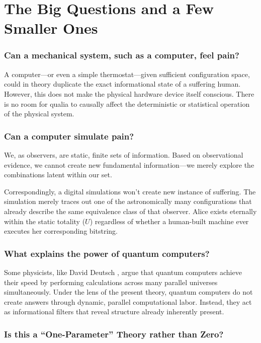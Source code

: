\chapter{The Big Questions and a Few Smaller Ones}
\label{chap:faq}

\subsection*{Can a mechanical system, such as a computer, feel pain?}

A computer—or even a simple thermostat—given sufficient configuration space, could in theory duplicate the exact informational state of a suffering human.
However, this does not make the physical hardware device itself conscious.
There is no room for qualia to causally affect the deterministic or statistical operation of the physical system.


\subsection*{Can a computer simulate pain?}

We, as observers, are static, finite sets of information.
Based on observational evidence, we cannot create new fundamental information—we merely explore the combinations latent within our set. 

Correspondingly, a digital simulations won't create new instance of suffering.
The simulation merely traces out one of the astronomically many configurations that already describe the same equivalence class of that observer.
Alice exists eternally within the static totality ($U$) regardless of whether a human-built machine ever executes her corresponding bitstring.


\subsection*{What explains the power of quantum computers?}

Some physicists, like David Deutsch \cite{deutsch1997fabric}, argue that quantum computers achieve their speed by performing calculations across many parallel universes simultaneously.
Under the lens of the present theory, quantum computers do not create answers through dynamic, parallel computational labor.
Instead, they act as informational filters that reveal structure already inherently present.


\subsection*{Is this a ``One-Parameter'' Theory rather than Zero?}

